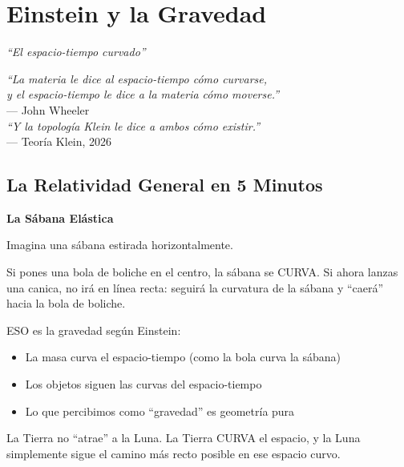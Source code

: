 \chapter{Einstein y la Gravedad}
\label{cap:einstein}

\begin{center}
\textit{``El espacio-tiempo curvado''}
\end{center}

\vspace{0.5cm}

\begin{tcolorbox}[colback=white, colframe=kleinblue, boxrule=2pt]
\centering
\textit{``La materia le dice al espacio-tiempo cómo curvarse,\\
y el espacio-tiempo le dice a la materia cómo moverse.''}\\
--- John Wheeler\\[0.3cm]
\textit{``Y la topología Klein le dice a ambos cómo existir.''}\\
--- Teoría Klein, 2026
\end{tcolorbox}


\section{La Relatividad General en 5 Minutos}

\begin{analogiabox}
\textbf{La Sábana Elástica}

Imagina una sábana estirada horizontalmente.

Si pones una bola de boliche en el centro, la sábana se CURVA.
Si ahora lanzas una canica, no irá en línea recta:
seguirá la curvatura de la sábana y ``caerá'' hacia la bola de boliche.

ESO es la gravedad según Einstein:
\begin{itemize}
    \item La masa curva el espacio-tiempo (como la bola curva la sábana)
    \item Los objetos siguen las curvas del espacio-tiempo
    \item Lo que percibimos como ``gravedad'' es geometría pura
\end{itemize}

La Tierra no ``atrae'' a la Luna. La Tierra CURVA el espacio,
y la Luna simplemente sigue el camino más recto posible
en ese espacio curvo.
\end{analogiabox}

